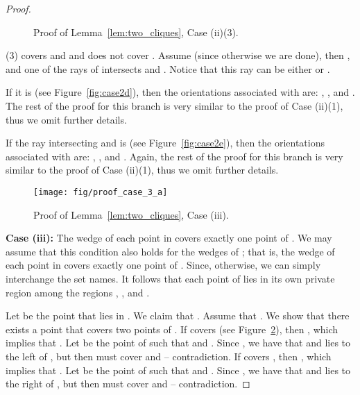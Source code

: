 \documentclass[11pt]{article}
\begin{document}
\begin{proof}
\begin{figure}[htb]
 \centering 
 \caption{Proof of Lemma~\ref{lem:two_cliques}, Case (ii)(3).}	\label{fig:caseb}
\end{figure}

 
(3)  covers  and  and does not cover . Assume  (since otherwise
we are done), then ,
and one of the rays of  intersects  and . Notice that this ray 
can be either  or . 

If it is  (see Figure~\ref{fig:case2d}), then
the orientations associated with  are:
, , and .
The rest of the proof for this branch is very similar to the proof of Case (ii)(1), thus we omit further details.

If the ray intersecting  and  is  (see Figure~\ref{fig:case2e}), then
the orientations associated with  are:
, , and .
Again, the rest of the proof for this branch is very similar to the proof of Case (ii)(1), thus we omit further details.

\begin{figure}[htb]
 \centering 
    \texttt{[image: fig/proof\_case\_3\_a]}
 \label{fig:case3a}
 \caption{Proof of Lemma~\ref{lem:two_cliques}, Case (iii).}	\label{fig:case3}
\end{figure}

{\bf Case (iii):} The wedge of each point in  covers exactly one point of . We may assume that this condition also holds for the wedges of ; that is, the wedge of each point in  covers exactly one point of . Since, otherwise, we can simply interchange the set names. 
It follows that each point of  lies in its own private region among the regions , , and . 

Let  be the point that lies in . We claim that .
Assume that . We show that there exists a point  that covers two points of .
If  covers  (see Figure~\ref{fig:case3}), then , which implies that . Let  be the point of  such that  and . Since , we have that  and  lies to the left of , but then  must cover  and  -- contradiction.
If  covers , then , which implies that . Let  be the point of  such that  and . Since , we have that  and  lies to the right of , but then  must cover  and  -- contradiction.

\end{proof}
\end{document}
